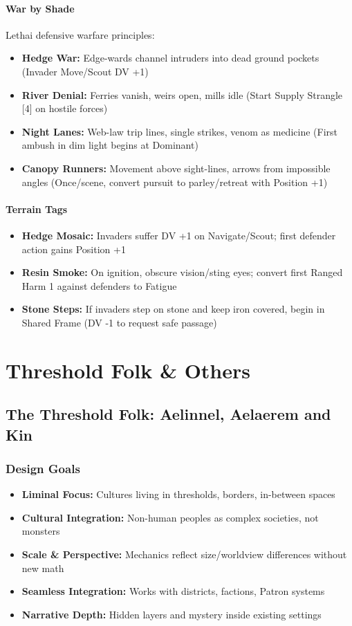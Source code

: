 \documentclass[11pt]{book}
\begin{document}
\subsection*{War by Shade}
Lethai defensive warfare principles: \\
\begin{itemize}
    \item \textbf{Hedge War:} Edge-wards channel intruders into dead ground pockets (Invader Move/Scout DV +1)
    \item \textbf{River Denial:} Ferries vanish, weirs open, mills idle (Start Supply Strangle [4] on hostile forces)
    \item \textbf{Night Lanes:} Web-law trip lines, single strikes, venom as medicine (First ambush in dim light begins at Dominant)
    \item \textbf{Canopy Runners:} Movement above sight-lines, arrows from impossible angles (Once/scene, convert pursuit to parley/retreat with Position +1)
\end{itemize}

\subsection*{Terrain Tags}
\begin{itemize}
    \item \textbf{Hedge Mosaic:} Invaders suffer DV +1 on Navigate/Scout; first defender action gains Position +1
    \item \textbf{Resin Smoke:} On ignition, obscure vision/sting eyes; convert first Ranged Harm 1 against defenders to Fatigue
    \item \textbf{Stone Steps:} If invaders step on stone and keep iron covered, begin in Shared Frame (DV -1 to request safe passage)
\end{itemize}

\newpage
\part{Threshold Folk & Others}
\chapter{The Threshold Folk: Aelinnel, Aelaerem and Kin}
\section{Design Goals}
\begin{itemize}
    \item \textbf{Liminal Focus:} Cultures living in thresholds, borders, in-between spaces
    \item \textbf{Cultural Integration:} Non-human peoples as complex societies, not monsters
    \item \textbf{Scale \& Perspective:} Mechanics reflect size/worldview differences without new math
    \item \textbf{Seamless Integration:} Works with districts, factions, Patron systems
    \item \textbf{Narrative Depth:} Hidden layers and mystery inside existing settings
\end{itemize}
\end{document}
